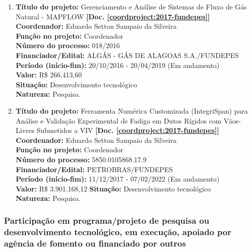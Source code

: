 \documentclass[a4paper,oneside,10pt]{article}
\begin{document}
\begin{enumerate}
\renewcommand{\labelenumi}{{\large\bfseries\arabic{enumi}.}}

\item \textbf{Título do projeto:} Gerenciamento e Análise de Sistemas de Fluxo de Gás Natural - MAPFLOW \textbf{[Doc. \ref{coordproject:2017-fundepes}]}\\
      \textbf{Coordenador:} Eduardo Setton Sampaio da Silveira\\
      \textbf{Função no projeto:} Coordenador\\
      \textbf{Número do processo:} 018/2016\\
      \textbf{Financiador/Edital:} ALGÁS - GÁS DE ALAGOAS S.A./FUNDEPES\\
      \textbf{Período (início-fim):} 20/10/2016 - 20/04/2019  (Em andamento)\\
      \textbf{Valor:} R\$ 266.413,60\\
      \textbf{Situação:} Desenvolvimento tecnológico\\
      \textbf{Natureza:} Pesquisa.

\item \textbf{Título do projeto:} Ferramenta Numérica Customizada (IntegriSpan) para Análise e Validação Experimental de Fadiga em Dutos Rígidos com Vãos-Livres Submetidos a VIV \textbf{[Doc. \ref{coordproject:2017-fundepes}]}\\
      \textbf{Coordenador:} Eduardo Setton Sampaio da Silveira\\
      \textbf{Função no projeto:} Coordenador\\
      \textbf{Número do processo:} 5850.0105868.17.9\\
      \textbf{Financiador/Edital:} PETROBRAS/FUNDEPES\\
      \textbf{Período (início-fim):} 11/12/2017 - 07/02/2022  (Em andamento)\\
       \textbf{Valor:} R\$ 3.901.168,12
      \textbf{Situação:} Desenvolvimento tecnológico\\
      \textbf{Natureza:} Pesquisa.
      
\end{enumerate}

\subsubsection{Participação em programa/projeto de pesquisa ou desenvolvimento tecnológico, em execução, apoiado por agência de fomento ou financiado por outros}
\vspace{0.3cm}
\end{document}
